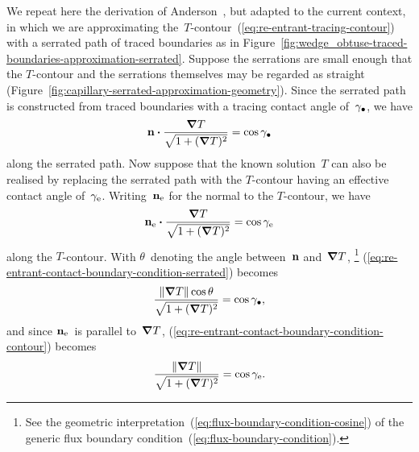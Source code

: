 \begin{figure}
\end{figure}

We repeat here the derivation of
Anderson~\cite[Section~6.4.2]{anderson-2002-thesis-boundary-tracing-pdes},
but adapted to the current context,
in which we are approximating
the~$T$-contour~(\ref{eq:re-entrant-tracing-contour})
with a serrated path of traced boundaries
as in Figure~\ref{fig:wedge_obtuse-traced-boundaries-approximation-serrated}.
Suppose the serrations are small enough
that the $T$-contour and the serrations themselves
may be regarded as straight
(Figure~\ref{fig:capillary-serrated-approximation-geometry}).
Since the serrated path is constructed from traced boundaries
with a tracing contact angle of~$\gamma_\bullet$,
we have
\begin{equation}
  \mathop{}\!\boldsymbol{\mathbf{n}} \boldsymbol{\cdot} \frac{\mathop{}\!\boldsymbol{\mathbf{\nabla}} T}{\sqrt{1 + (\mathop{}\!\boldsymbol{\mathbf{\nabla}} T)^2}} = \cos\gamma_\bullet
  \label{eq:re-entrant-contact-boundary-condition-serrated}
\end{equation}
along the serrated path.
Now suppose that the known solution~$T$ can also be realised
by replacing the serrated path with the $T$-contour
having an effective contact angle of~$\gamma_{\mathrm{e}}$.
Writing~$\mathop{}\!\boldsymbol{\mathbf{n}}_{\mathrm{e}}$ for the normal to the $T$-contour,
we have
\begin{equation}
  \mathop{}\!\boldsymbol{\mathbf{n}}_{\mathrm{e}} \boldsymbol{\cdot} \frac{\mathop{}\!\boldsymbol{\mathbf{\nabla}} T}{\sqrt{1 + (\mathop{}\!\boldsymbol{\mathbf{\nabla}} T)^2}} = \cos\gamma_{\mathrm{e}}
  \label{eq:re-entrant-contact-boundary-condition-contour}
\end{equation}
along the $T$-contour.
With $\theta$~denoting the angle between~$\mathop{}\!\boldsymbol{\mathbf{n}}$ and~$\mathop{}\!\boldsymbol{\mathbf{\nabla}} T$,%
\footnote{
  See the geometric interpretation~(\ref{eq:flux-boundary-condition-cosine})
  of the generic flux boundary condition~(\ref{eq:flux-boundary-condition}).
}
(\ref{eq:re-entrant-contact-boundary-condition-serrated}) becomes
\begin{equation}
  \frac{\lVert\mathop{}\!\boldsymbol{\mathbf{\nabla}} T\rVert \cos\theta}{\sqrt{1 + (\mathop{}\!\boldsymbol{\mathbf{\nabla}} T)^2}} = \cos\gamma_\bullet,
  \label{eq:re-entrant-contact-boundary-condition-serrated-simplified}
\end{equation}
and since $\mathop{}\!\boldsymbol{\mathbf{n}}_{\mathrm{e}}$~is parallel to~$\mathop{}\!\boldsymbol{\mathbf{\nabla}} T$,
(\ref{eq:re-entrant-contact-boundary-condition-contour}) becomes
\begin{equation}
  \frac{\lVert\mathop{}\!\boldsymbol{\mathbf{\nabla}} T\rVert}{\sqrt{1 + (\mathop{}\!\boldsymbol{\mathbf{\nabla}} T)^2}} = \cos\gamma_{\mathrm{e}}.
  \label{eq:re-entrant-contact-boundary-condition-contour-simplified}
\end{equation}
